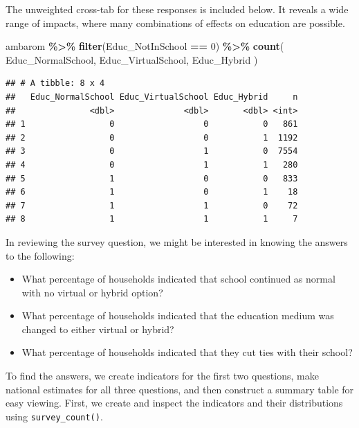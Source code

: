 \documentclass[
]{krantz}
\makeatletter
\newenvironment{Shaded}{\begin{snugshade}}{\end{snugshade}}
\newcommand{\DecValTok}[1]{\textcolor[rgb]{0.06,0.06,0.06}{#1}}
\newcommand{\FunctionTok}[1]{\textcolor[rgb]{0.27,0.27,0.27}{\textbf{#1}}}
\newcommand{\NormalTok}[1]{#1}
\newcommand{\SpecialCharTok}[1]{\textcolor[rgb]{0.43,0.43,0.43}{\textbf{#1}}}
\providecommand{\tightlist}{%
  \setlength{\itemsep}{0pt}\setlength{\parskip}{0pt}}
\newenvironment{kframe}{%
\medskip{}
\setlength{\fboxsep}{.8em}
 \def\at@end@of@kframe{}%
 \ifinner\ifhmode%
  \def\at@end@of@kframe{\end{minipage}}%
  \begin{minipage}{\columnwidth}%
 \fi\fi%
 \def\FrameCommand##1{\hskip\@totalleftmargin \hskip-\fboxsep
 \colorbox{shadecolor}{##1}\hskip-\fboxsep
     \hskip-\linewidth \hskip-\@totalleftmargin \hskip\columnwidth}%
 \MakeFramed {\advance\hsize-\width
   \@totalleftmargin\z@ \linewidth\hsize
   \@setminipage}}%
 {\par\unskip\endMakeFramed%
 \at@end@of@kframe}
\renewenvironment{Shaded}{\begin{kframe}}{\end{kframe}}
\makeatother
\begin{document}
The unweighted cross-tab for these responses is included below. It reveals a wide range of impacts, where many combinations of effects on education are possible.

\begin{Shaded}
\begin{Highlighting}[]
\NormalTok{ambarom }\SpecialCharTok{\%\textgreater{}\%}
  \FunctionTok{filter}\NormalTok{(Educ\_NotInSchool }\SpecialCharTok{==} \DecValTok{0}\NormalTok{) }\SpecialCharTok{\%\textgreater{}\%}
  \FunctionTok{count}\NormalTok{(}
\NormalTok{    Educ\_NormalSchool,}
\NormalTok{    Educ\_VirtualSchool,}
\NormalTok{    Educ\_Hybrid}
\NormalTok{  )}
\end{Highlighting}
\end{Shaded}

\begin{verbatim}
## # A tibble: 8 x 4
##   Educ_NormalSchool Educ_VirtualSchool Educ_Hybrid     n
##               <dbl>              <dbl>       <dbl> <int>
## 1                 0                  0           0   861
## 2                 0                  0           1  1192
## 3                 0                  1           0  7554
## 4                 0                  1           1   280
## 5                 1                  0           0   833
## 6                 1                  0           1    18
## 7                 1                  1           0    72
## 8                 1                  1           1     7
\end{verbatim}

In reviewing the survey question, we might be interested in knowing the answers to the following:

\begin{itemize}
\tightlist
\item
  What percentage of households indicated that school continued as normal with no virtual or hybrid option?
\item
  What percentage of households indicated that the education medium was changed to either virtual or hybrid?
\item
  What percentage of households indicated that they cut ties with their school?
\end{itemize}

To find the answers, we create indicators for the first two questions, make national estimates for all three questions, and then construct a summary table for easy viewing. First, we create and inspect the indicators and their distributions using \texttt{survey\_count()}.
\end{document}
